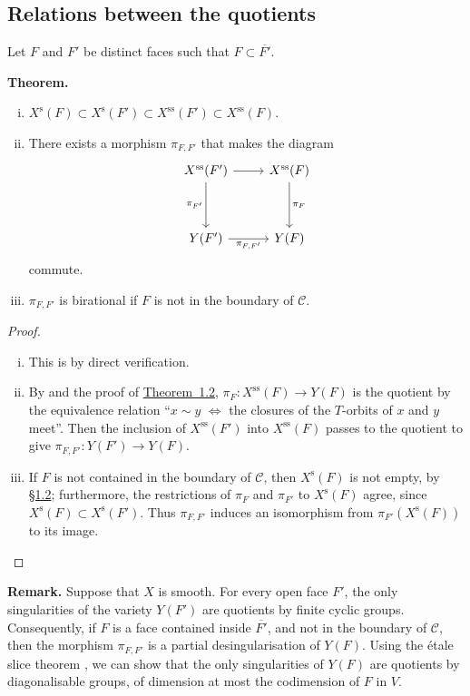 \documentclass{article}
\newenvironment{itenv}[1]
  {\phantomsection\par\medskip\noindent\textbf{#1.}\itshape}
  {\par\medskip}
\newenvironment{rmenv}[1]
  {\phantomsection\par\medskip\noindent\textbf{#1.}\rmfamily}
  {\par\medskip}
\newcommand{\s}{\mathrm{s}}
\renewcommand{\ss}{\mathrm{ss}}
\newcommand{\oldpage}[1]{\marginpar{\footnotesize$\Big\vert$ \textit{p.~#1}}}
\begin{document}
\subsection{Relations between the quotients}
\label{1.4}

Let $F$ and $F'$ be distinct faces such that $F\subset\overline{F'}$.

\begin{itenv}{Theorem}
  \begin{enumerate}[(i)]
    \item $X^\s(F) \subset X^\s(F') \subset X^\ss(F') \subset X^\ss(F)$.
    \item There exists a morphism $\pi_{F,F'}$ that makes the diagram
      \[
        \begin{tikzcd}[row sep=huge]
          X^\ss(F') \rar \dar[swap,"\pi_{F'}"]
          & X^\ss(F) \dar["\pi_F"]
        \\Y(F') \rar[swap,"\pi_{F,F'}"]
          & Y(F)
        \end{tikzcd}
      \]
      commute.
    \item $\pi_{F,F'}$ is birational if $F$ is not in the boundary of $\mathcal{C}$.
  \end{enumerate}
\end{itenv}

\oldpage{515}
\begin{proof}
  \begin{enumerate}[(i)]
    \item This is by direct verification.
    \item By \cite[1.11]{MF} and the proof of \hyperref[1.2-theorem]{Theorem~1.2}, $\pi_F\colon X^\ss(F)\to Y(F)$ is the quotient by the equivalence relation ``$x\sim y$ $\iff$ the closures of the $T$-orbits of $x$ and $y$ meet''.
      Then the inclusion of $X^\ss(F')$ into $X^\ss(F)$ passes to the quotient to give $\pi_{F,F'}\colon Y(F')\to Y(F)$.
    \item If $F$ is not contained in the boundary of $\mathcal{C}$, then $X^\s(F)$ is not empty, by \hyperref[1.2]{\S1.2};
      furthermore, the restrictions of $\pi_F$ and $\pi_{F'}$ to $X^\s(F)$ agree, since $X^\s(F)\subset X^\s(F')$.
      Thus $\pi_{F,F'}$ induces an isomorphism from $\pi_{F'}(X^\s(F))$ to its image.
  \end{enumerate}
\end{proof}

\begin{rmenv}{Remark}
  Suppose that $X$ is smooth.
  For every open face $F'$, the only singularities of the variety $Y(F')$ are quotients by finite cyclic groups.
  Consequently, if $F$ is a face contained inside $\overline{F'}$, and not in the boundary of $\mathcal{C}$, then the morphism $\pi_{F,F'}$ is a partial desingularisation of $Y(F)$.
  Using the \'{e}tale slice theorem \cite[III.1]{Lun}, we can show that the only singularities of $Y(F)$ are quotients by diagonalisable groups, of dimension at most the codimension of $F$ in $V$.
\end{rmenv}
\end{document}
